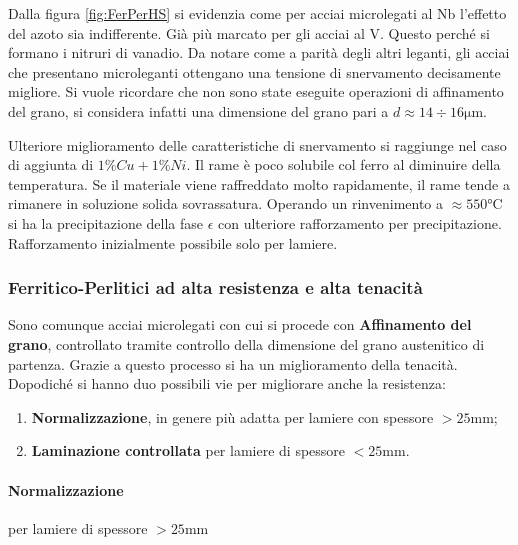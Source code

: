 Dalla figura \ref{fig:FerPerHS} si evidenzia come per acciai microlegati
al Nb l'effetto del azoto sia indifferente. Già più marcato per gli 
acciai al V. Questo perché si formano i nitruri di vanadio.
Da notare come a parità degli altri leganti, gli acciai che presentano
microleganti ottengano una tensione di snervamento decisamente migliore.
Si vuole ricordare che non sono state eseguite operazioni di affinamento 
del grano, si considera infatti una dimensione del grano pari a $d 
\approx 14 \div 16\unit{\um}$.

Ulteriore miglioramento delle caratteristiche di snervamento si 
raggiunge nel caso di aggiunta di $1\%Cu + 1\%Ni$.
Il rame è poco solubile col ferro al diminuire della temperatura.
Se il materiale viene raffreddato molto rapidamente, il rame tende a 
rimanere in soluzione solida sovrassatura.
Operando un rinvenimento a $\approx 550\unit{\celsius}$ si ha la 
precipitazione della fase $\epsilon$ con ulteriore rafforzamento per 
precipitazione.
Rafforzamento inizialmente possibile solo per lamiere.

\subsubsection{Ferritico-Perlitici ad alta resistenza e alta tenacità}
Sono comunque acciai microlegati con cui si procede con 
\textbf{Affinamento del grano}, controllato tramite controllo della
dimensione del grano austenitico di partenza.
Grazie a questo processo si ha un miglioramento della tenacità.
Dopodiché si hanno duo possibili vie per migliorare anche la resistenza:
\begin{enumerate}
\item \textbf{Normalizzazione}, in genere più adatta per lamiere con 
spessore $>25\unit{\mm}$;
\item \textbf{Laminazione controllata} per lamiere di spessore 
$<25\unit{\mm}$.
\end{enumerate}

\paragraph*{Normalizzazione} per lamiere di spessore $>25\unit{\mm}$